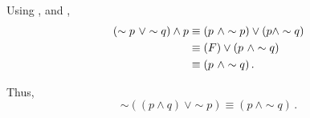 \begin{subquestions}
Using ,  and ,
\begin{align}
	(\sim p ~\lor \sim q) \land p & \equiv (p ~\land \sim p) \lor (p \land \sim q) \nonumber \\
	                              & \equiv (F) \lor (p ~\land \sim q) \nonumber \\
	                              & \equiv (p ~\land \sim q) \,.
\end{align}

Thus,
\begin{equation}
	\sim((p \land q) ~\lor \sim p) \equiv (p ~\land \sim q) \,.
\end{equation}

\end{subquestions}


